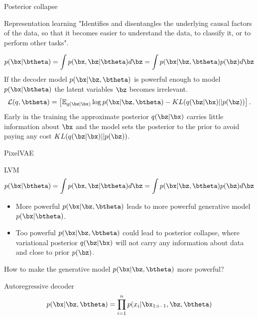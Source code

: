 \begin{frame}{Posterior collapse}
	\begin{block}{Representation learning}
		"Identifies and disentangles the underlying causal factors of the data, so that it becomes easier to understand the data, to classify it, or to perform other tasks".
	\end{block}
	\vspace{-0.2cm}
	\[
		p(\bx | \btheta) = \int p(\bx, \bz | \btheta) d \bz = \int p(\bx | \bz, \btheta) p(\bz) d \bz 
	\]
	If the decoder model $p(\bx | \bz, \btheta)$ is powerful enough to model $p(\bx | \btheta)$ the latent variables $\bz$ becomes irrelevant.
	\[
		\mathcal{L}(q, \btheta) = \left[ \mathbb{E}_{q(\bz | \bx)} \log p(\bx | \bz, \btheta) - KL(q(\bz | \bx) || p(\bz)) \right].
	\]
	Early in the training the approximate posterior $q(\bz|\bx)$ carries little information about $\bx$ and the model sets the posterior to the prior to avoid paying any cost $KL(q(\bz|\bx)||p(\bz))$.
\end{frame}
\begin{frame}{PixelVAE}
	\begin{block}{LVM}
		\vspace{-0.3cm}
		\[
		    p(\bx | \btheta) = \int p(\bx, \bz | \btheta) d \bz = \int p(\bx | \bz, \btheta) p(\bz) d \bz 
		\]
		\vspace{-0.3cm}
	\end{block}
	\begin{itemize}
		\item More powerful $p(\bx | \bz, \btheta)$ leads to more powerful generative model $p(\bx | \btheta)$.
		\item Too powerful $p(\bx | \bz, \btheta)$ could lead to posterior collapse, where variational posterior $q(\bz | \bx)$ will not carry any information about data and close to prior $p(\bz)$.
	\end{itemize}
	How to make the generative model $p(\bx | \bz, \btheta)$ more powerful?
	\begin{block}{Autoregressive decoder}
		\vspace{-0.2cm}
		\[
		    p(\bx | \bz , \btheta) = \prod_{i=1}^n p(x_i | \bx_{1:i - 1}, \bz , \btheta)
		\]
	\end{block}
	
\end{frame}
